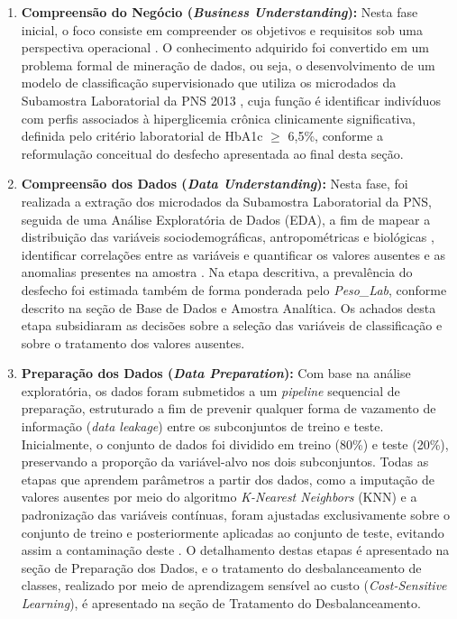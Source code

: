 \begin{enumerate}
    \item \textbf{Compreensão do Negócio (\textit{Business Understanding}):} Nesta fase inicial, o foco consiste em compreender os objetivos e requisitos sob uma perspectiva operacional \cite{wirth2000crisp}. O conhecimento adquirido foi convertido em um problema formal de mineração de dados, ou seja, o desenvolvimento de um modelo de classificação supervisionado que utiliza os microdados da Subamostra Laboratorial da PNS 2013 \cite{IBGE_PNS2013_Exames}, cuja função é identificar indivíduos com perfis associados à hiperglicemia crônica clinicamente significativa, definida pelo critério laboratorial de HbA1c $\geq$ 6,5\%, conforme a reformulação conceitual do desfecho apresentada ao final desta seção.

    \item \textbf{Compreensão dos Dados (\textit{Data Understanding}):} Nesta fase, foi realizada a extração dos microdados da Subamostra Laboratorial da PNS, seguida de uma Análise Exploratória de Dados (EDA), a fim de mapear a distribuição das variáveis sociodemográficas, antropométricas e biológicas \cite{morgenthaler2009exploratory}, identificar correlações entre as variáveis e quantificar os valores ausentes e as anomalias presentes na amostra \cite{sahoo2019exploratory}. Na etapa descritiva, a prevalência do desfecho foi estimada também de forma ponderada pelo \textit{Peso\_Lab}, conforme descrito na seção de Base de Dados e Amostra Analítica. Os achados desta etapa subsidiaram as decisões sobre a seleção das variáveis de classificação e sobre o tratamento dos valores ausentes.

   \item \textbf{Preparação dos Dados (\textit{Data Preparation}):} Com base na análise exploratória, os dados foram submetidos a um \textit{pipeline} sequencial de preparação, estruturado a fim de prevenir qualquer forma de vazamento de informação (\textit{data leakage}) entre os subconjuntos de treino e teste. Inicialmente, o conjunto de dados foi dividido em treino (80\%) e teste (20\%), preservando a proporção da variável-alvo nos dois subconjuntos. Todas as etapas que aprendem parâmetros a partir dos dados, como a imputação de valores ausentes por meio do algoritmo \textit{K-Nearest Neighbors} (KNN) e a padronização das variáveis contínuas, foram ajustadas exclusivamente sobre o conjunto de treino e posteriormente aplicadas ao conjunto de teste, evitando assim a contaminação deste \cite{pedregosa2011scikit}. O detalhamento destas etapas é apresentado na seção de Preparação dos Dados, e o tratamento do desbalanceamento de classes, realizado por meio de aprendizagem sensível ao custo (\textit{Cost-Sensitive Learning}), é apresentado na seção de Tratamento do Desbalanceamento.


\end{enumerate}
